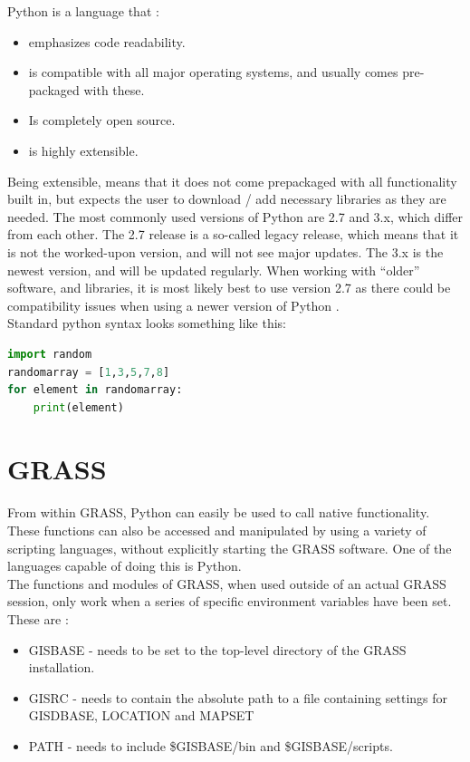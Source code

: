 Python is a language that \citep{pybook}:
\begin{itemize}
\item emphasizes code readability.
\item is compatible with all major operating systems, and usually comes pre-packaged with these. 
\item Is completely open source. 
\item is highly extensible. 
\end{itemize}
Being extensible, means that it does not come prepackaged with all functionality built in, but expects the user to download / add necessary libraries as they are needed. 
The most commonly used versions of Python are 2.7 and 3.x, which differ from each other. The 2.7 release is a so-called legacy release, which means that it is not the worked-upon version, and will not see major updates. The 3.x is the newest version, and will be updated regularly. When working with “older” software, and libraries, it is most likely best to use version 2.7 as there could be compatibility issues when using a newer version of Python \citep{python}.\\

Standard python syntax looks something like this:\\

\begin{lstlisting}[language=Python]
import random
randomarray = [1,3,5,7,8]
for element in randomarray:
	print(element)
\end{lstlisting}

\section{GRASS}
From within GRASS, Python can easily be used to call native functionality. These functions can also be accessed and manipulated by using a variety of scripting languages, without explicitly starting the GRASS software. One of the languages capable of doing this is Python. \citep{grassbook} \\

The functions and modules of GRASS, when used outside of an actual GRASS session, only work when a series of specific environment variables have been set. 
These are \citep{grasswiki}:
\begin{itemize}
\item GISBASE - needs to be set to the top-level directory of the GRASS installation. 
\item GISRC - needs to contain the absolute path to a file containing settings for GISDBASE, LOCATION and MAPSET 
\item PATH - needs to include \$GISBASE/bin and \$GISBASE/scripts.
\end{itemize}

